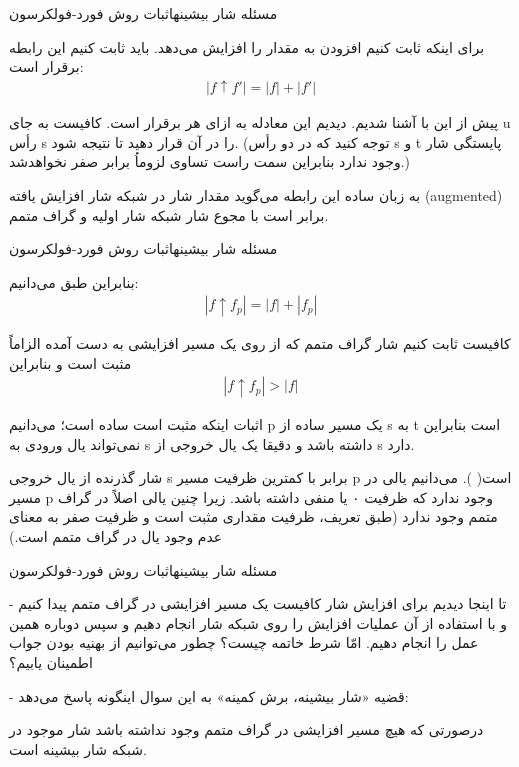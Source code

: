 \begin{itemframe}{مسئله شار بیشینه}{اثبات روش فورد-فولکرسون}

\item
برای اینکه ثابت کنیم افزودن
به
مقدار
را افزایش می‌دهد. باید ثابت کنیم این رابطه برقرار است:
\begin{align}
|f \uparrow f'|=|f| + |f'|
\label{aug-flow-sum}
\end{align}
\item

پیش از این با
آشنا شدیم. دیدیم این معادله به ازای هر
برقرار است. کافیست به جای u رأس s را در آن قرار دهید تا
نتیجه شود. (توجه کنید که در دو رأس s و t پایستگی شار وجود ندارد بنابراین سمت راست تساوی لزوماُ برابر صفر نخواهد‌شد.)
\item
به زبان ساده این رابطه می‌گوید مقدار شار در شبکه شار افزایش یافته (augmented) برابر است با مجوع شار شبکه شار اولیه و گراف متمم.
\end{itemframe}

\begin{itemframe}{مسئله شار بیشینه}{اثبات روش فورد-فولکرسون}
\item
بنابراین طبق
می‌دانیم:
\begin{align*}
|f \uparrow f_p| = |f| + |f_p|
\end{align*}
\item
کافیست ثابت کنیم شار گراف متمم که از روی یک مسیر افزایشی به دست آمده الزاماً مثبت است و بنابراین
\begin{align*}
|f \uparrow f_p| > |f|
\end{align*}
\item
اثبات اینکه
مثبت است ساده است؛ می‌دانیم p یک مسیر ساده از s به t است بنابراین نمی‌تواند یال ورودی به s داشته باشد و دقیقا یک یال خروجی از s دارد.
\item
شار گذرنده از یال خروجی s برابر با کمترین ظرفیت مسیر p است(
).  می‌دانیم یالی در مسیر p وجود ندارد که ظرفیت ۰ یا منفی داشته باشد. زیرا چنین یالی اصلاً در گراف متمم وجود ندارد (طبق تعریف، ظرفیت مقداری مثبت است و ظرفیت صفر به معنای عدم وجود یال در گراف متمم است.)
\end{itemframe}

\begin{itemframe}{مسئله شار بیشینه}{اثبات روش فورد-فولکرسون}
\item[-]
تا اینجا دیدیم برای افزایش شار کافیست یک مسیر افزایشی در گراف متمم پیدا کنیم و با استفاده از آن عملیات افزایش را روی شبکه شار انجام دهیم و سپس دوباره همین عمل را انجام دهیم. امّا شرط خاتمه چیست؟ چطور می‌توانیم از بهنیه بودن جواب اطمینان یابیم؟
\item[-]
قضیه «شار بیشینه، برش کمینه»
به این سوال اینگونه پاسخ می‌دهد:

درصورتی که هیچ مسیر افزایشی در گراف متمم وجود نداشته باشد شار موجود در شبکه شار بیشینه است.
\end{itemframe}

